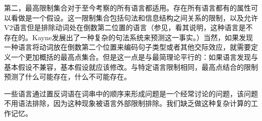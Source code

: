 第二，最高限制集合对于至今考察的所有语言都适用。存在所有语言都有的属性可以看做是一个假设。这一限制集合包括句法和信息结构之间关系的限制，以及允许V2语言但是排除动词处在倒数第二位置的语言（参见\citealp[]{Kayne94a-u}，看其说明，这种语言是不存在的。Kayne发展出了一种复杂的句法系统来预测这一事实。）当然，如果发现一种语言将动词放在倒数第二个位置来编码句子类型或者其他交际效应，就需要定义一个更加概括的最高点集合。但是这一点是与最简理论平行的：如果语言发现与基本假设不兼容，基本假设就应该修改。与特定语言限制相同，最高点结合的限制预测了什么可能存在，什么不可能存在。

一些语言通过置反词语在词串中的顺序来形成问题\citep{MMGRRBW2003a}是一个经常讨论的问题，该问题不用语法排除，因为这种现象被语言外部限制排除。我们缺乏做这种复杂计算的工作记忆。

